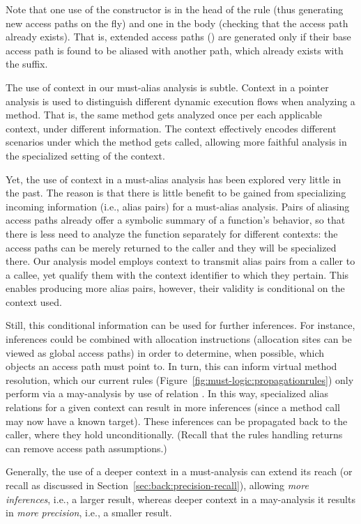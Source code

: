 Note that one use of the constructor  is in the head of the rule (thus generating new access paths on the fly) and one in the body (checking that the access path already exists). That is, extended access paths () are generated only if their base access path is found to be aliased with another path, which already exists with the  suffix.


The use of context in our must-alias analysis is subtle. Context in a pointer analysis is used to distinguish different dynamic execution flows when analyzing a method. That is, the same method gets analyzed once per each applicable context, under different information. The context effectively encodes different scenarios under which the method gets called, allowing more faithful analysis in the specialized setting of the context.

Yet, the use of context in a must-alias analysis has been explored very little in the past. The reason is that there is little benefit to be gained from specializing incoming information (i.e., alias pairs) for a must-alias analysis. Pairs of aliasing access paths already offer a symbolic summary of a function's behavior, so that there is less need to analyze the function separately for different contexts: the access paths can be merely returned to the caller and they will be specialized there. Our analysis model employs context to transmit alias pairs from a caller to a callee, yet qualify them with the context identifier to which they pertain. This enables producing more alias pairs, however, their validity is conditional on the context used.

Still, this conditional information can be used for further inferences. For instance,  inferences could be combined with allocation instructions (allocation sites can be viewed as global access paths) in order to determine, when possible, which objects an access path must point to. In turn, this can inform virtual method resolution, which our current rules (Figure~\ref{fig:must-logic:propagationrules}) only perform via a may-analysis by use of relation . In this way, specialized alias relations for a given context can result in more inferences (since a method call may now have a known target). These inferences can be propagated back to the caller, where they hold unconditionally. (Recall that the rules handling returns can remove access path assumptions.)

Generally, the use of a deeper context in a must-analysis can extend its reach (or recall as discussed in Section~\ref{sec:back:precision-recall}), allowing \emph{more inferences}, i.e., a larger result, whereas deeper context in a may-analysis it results in \emph{more precision}, i.e., a smaller result. 

